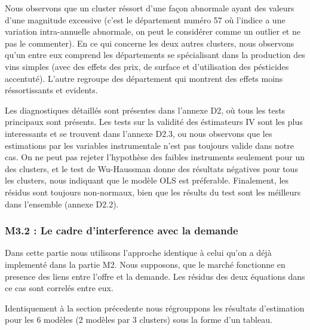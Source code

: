 \documentclass[11pt,]{article}
\begin{document}
\FloatBarrier

Nous observons que un cluster réssort d'une façon abnormale ayant des
valeurs d'une magnitude excessive (c'est le département numéro 57 où
l'indice a une variation intra-annuelle abnormale, on peut le considérer
comme un outlier et ne pas le commenter). En ce qui concerne les deux
autres clusters, nous observons qu'un entre eux comprend les
départements se spécialisant dans la production des vins simples (avec
des effets des prix, de surface et d'utilisation des pésticides
accentuté). L'autre regroupe des département qui montrent des effets
moins réssortissants et evidents.

Les diagnostiques détaillés sont présentes dans l'annexe D2, où tous les
tests principaux sont présents. Les tests sur la validité des
éstimateurs IV sont les plus interessants et se trouvent dans l'annexe
D2.3, ou nous observons que les estimations par les variables
instrumentale n'est pas toujours valide dans notre cas. On ne peut pas
rejeter l'hypothèse des faibles instruments seulement pour un des
clusters, et le test de Wu-Haussman donne des résultats négatives pour
tous les clusters, nous indiquant que le modèle OLS est préferable.
Finalement, les résidus sont toujours non-normaux, bien que les résults
du test sont les méilleurs dans l'ensemble (annexe D2.2).

\hypertarget{m3.2-le-cadre-dinterference-avec-la-demande}{%
\subsubsection{M3.2 : Le cadre d'interference avec la
demande}\label{m3.2-le-cadre-dinterference-avec-la-demande}}

Dans cette partie nous utilisons l'approche identique à celui qu'on a
déjà implementé dans la partie M2. Nous supposons, que le marché
fonctionne en presence des liens entre l'offre et la demande. Les
résidus des deux équations dans ce cas sont correlés entre eux.

Identiquement à la section précedente nous régrouppons les résultats
d'estimation pour les 6 modèles (2 modèles par 3 clusters) sous la forme
d'un tableau.

\FloatBarrier
\end{document}
